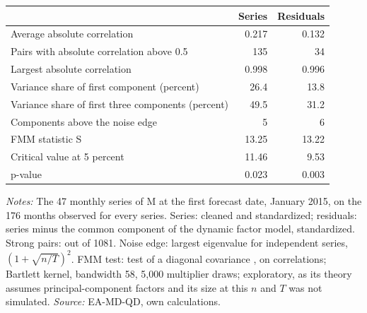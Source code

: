\begin{threeparttable}
\begin{tabular}{lrr}
\toprule
 & Series & Residuals \\
\midrule
Average absolute correlation & 0.217 & 0.132 \\
Pairs with absolute correlation above 0.5 & 135 & 34 \\
Largest absolute correlation & 0.998 & 0.996 \\
Variance share of first component (percent) & 26.4 & 13.8 \\
Variance share of first three components (percent) & 49.5 & 31.2 \\
Components above the noise edge & 5 & 6 \\
FMM statistic S & 13.25 & 13.22 \\
Critical value at 5 percent & 11.46 & 9.53 \\
p-value & 0.023 & 0.003 \\
\bottomrule
\end{tabular}
\begin{tablenotes}[flushleft]\footnotesize
\item \textit{Notes:} The 47 monthly series of M at the first forecast date, January 2015, on the 176 months observed for every series. Series: cleaned and standardized; residuals: series minus the common component of the dynamic factor model, standardized. Strong pairs: out of 1081. Noise edge: largest eigenvalue for independent series, $(1+\sqrt{n/T})^2$. FMM test: test of a diagonal covariance \citep{fan2023}, on correlations; Bartlett kernel, bandwidth 58, 5{,}000 multiplier draws; exploratory, as its theory assumes principal-component factors and its size at this $n$ and $T$ was not simulated. \textit{Source:} EA-MD-QD, own calculations.
\end{tablenotes}
\end{threeparttable}
